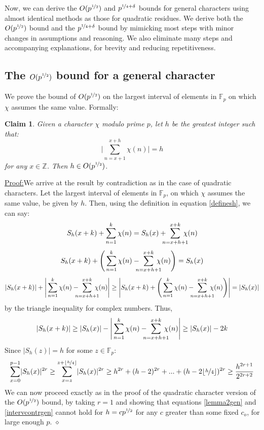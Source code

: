 \documentclass{report}
\newtheorem*{claim*}{Claim}
\newenvironment{claimproof}[1]{\vspace{2.5mm}\par\noindent\underline{Proof:}\space#1}{\hfill $\diamond$ \vspace{2.5mm} \par}
\begin{document}
Now, we can derive the $O(p^{\nicefrac{1}{2}})$ and $p^{\nicefrac{1}{4}+\delta}$ bounds for general characters using almost identical methods as those for quadratic residues. We derive both the $O(p^{\nicefrac{1}{2}})$ bound and the $p^{\nicefrac{1}{4}+\delta}$ bound by mimicking most steps with minor changes in assumptions and reasoning. We also eliminate many steps and accompanying explanations, for brevity and reducing repetitiveness.
\subsection{The $O(p^{\nicefrac{1}{2}})$ bound for a general character}
We prove the bound of $O(p^{\nicefrac{1}{2}})$ on the largest interval of elements in $\mathbb{F}_p$ on which $\chi$ assumes the same value. Formally:
\begin{claim*}
Given a character $\chi$ modulo prime $p$, let $h$ be the greatest integer such that:
\[\bigg\lvert\sum\limits_{n=x+1}^{x+h}\chi(n)\bigg\rvert=h\]
 for any $x\in\mathbb{Z}$. Then $h\in O(p^{\nicefrac{1}{2}})$.
\end{claim*}
\begin{claimproof}
We arrive at the result by contradiction as in the case of quadratic characters. Let the largest interval of elements in $\mathbb{F}_p$, on which $\chi$ assumes the same value, be given by $h$. Then, using the definition in equation \ref{definesh}, we can say:
\[ S_h(x+k) + \sum\limits_{n=1}^k \chi(n)= S_h(x) +\  \sum\limits_{\mathclap{n=x+h+1}}^{x+k}\:\chi(n)\]
\[ S_h(x+k) + \Bigg(\sum\limits_{n=1}^k \chi(n) -\  \sum\limits_{\mathclap{n=x+h+1}}^{x+k}\:\chi(n) \Bigg) = S_h(x)\]
\[ \lvert S_h(x+k) \rvert + \Bigg\lvert\sum\limits_{n=1}^k \chi(n) -\  \sum\limits_ {\mathclap {n=x+h+1}}^{x+k} \:\chi(n) \Bigg\rvert \geq  \Bigg\lvert S_h(x+k) + \Bigg(\sum\limits_{n=1}^k \chi(n) -\  \sum\limits_ {\mathclap {n=x+h+1}}^{x+k} \:\chi(n) \Bigg) \Bigg\rvert= \lvert S_h(x)\rvert \]
by the triangle inequality for complex numbers. Thus,
\[ \lvert S_h(x+k)\rvert \geq  \lvert S_h(x)\rvert - \Bigg\lvert\sum\limits_{n=1}^k \chi(n) -\  \sum\limits_ {\mathclap {n=x+h+1}}^{x+k} \:\chi(n) \Bigg\rvert \geq \lvert S_h(x)\rvert-2k\]
Since $\lvert S_h(z)\rvert=h$ for some $z\in\mathbb{F}_p$:
\begin{equation} \label{intervcontrgen}
\sum\limits_{x=0}^{p-1}\lvert S_h(x)\rvert^{2r}\geq\sum\limits_{x=z}^{z+\lfloor\nicefrac{h}{4}\rfloor}\lvert S_h(x)\rvert^{2r} \geq h^{2r}+(h-2)^{2r}+...+(h-2\lfloor\nicefrac{h}{4}\rfloor)^{2r} \geq \frac{h^{2r+1}}{2^{2r+2}}
\end{equation}
We can now proceed exactly as in the proof of the quadratic character version of the $O(p^ {\nicefrac{1}{2}})$ bound, by taking $r=1$ and showing that equations \ref{lemma2gen} and \ref{intervcontrgen} cannot hold for $h=cp ^{\nicefrac {1}{2}}$ for any $c$ greater than some fixed $c_o$, for large enough $p$.
\end{claimproof}
\end{document}
